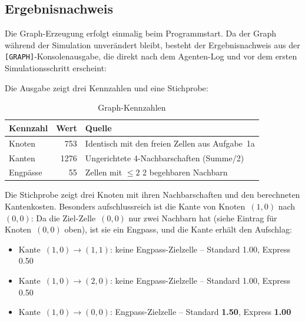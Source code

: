 
\subsection{Ergebnisnachweis}
\label{sssec:graph_3a_nachweis}

Die Graph-Erzeugung erfolgt einmalig beim Programmstart. Da der Graph während der Simulation unverändert bleibt, besteht der Ergebnisnachweis aus der \texttt{[GRAPH]}-Konsolenausgabe, die direkt nach dem Agenten-Log und vor dem ersten Simulationsschritt erscheint:



Die Ausgabe zeigt drei Kennzahlen und eine Stichprobe:

\begin{table}[H]
    \centering
    \begin{tabular}{l r l}
        \toprule
        \textbf{Kennzahl} & \textbf{Wert} & \textbf{Quelle} \\
        \midrule
        Knoten   & 753 & Identisch mit den freien Zellen aus Aufgabe~1a \\
        Kanten   & 1276 & Ungerichtete 4-Nachbarschaften (Summe/2) \\
        Engpässe & 55  & Zellen mit \(\leq 2\) 2 begehbaren Nachbarn \\
        \bottomrule
    \end{tabular}
    \caption{Graph-Kennzahlen}
    \label{tab:graph_3a_stats}
\end{table}

Die Stichprobe zeigt drei Knoten mit ihren Nachbarschaften und den berechneten Kantenkosten. Besonders aufschlussreich ist die Kante von Knoten~\((1, 0)\) nach~\((0, 0)\): Da die Ziel-Zelle~\((0, 0)\) nur zwei Nachbarn hat (siehe Eintrag für Knoten~\((0, 0)\) oben), ist sie ein Engpass, und die Kante erhält den Aufschlag:

\begin{itemize}
    \item Kante~\((1,0) \to (1,1)\): keine Engpass-Zielzelle -- Standard 1.00, Express 0.50
    \item Kante~\((1,0) \to (2,0)\): keine Engpass-Zielzelle -- Standard 1.00, Express 0.50
    \item Kante~\((1,0) \to (0,0)\): Engpass-Zielzelle -- Standard \textbf{1.50}, Express \textbf{1.00}
\end{itemize}

